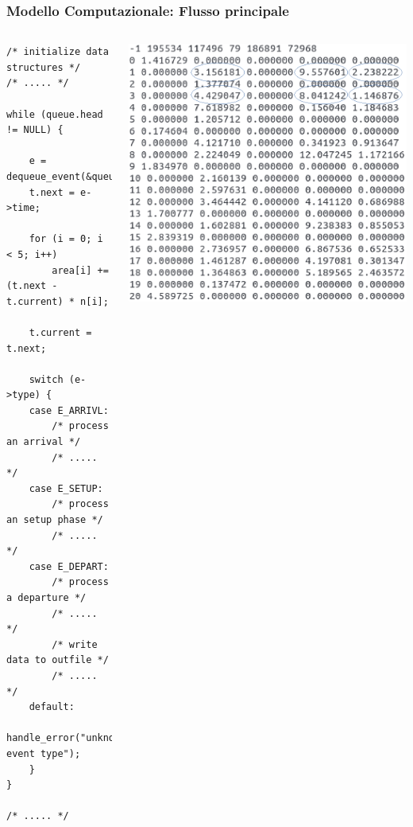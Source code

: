 \begin{frame}[fragile]
\frametitle{Modello Computazionale: Flusso principale}
\begin{columns}
\begin{lstlisting}
/* initialize data structures */
/* ..... */

while (queue.head != NULL) { 

    e = dequeue_event(&queue);
    t.next = e->time;

    for (i = 0; i < 5; i++)
        area[i] += (t.next - t.current) * n[i];

    t.current = t.next;   

    switch (e->type) {
    case E_ARRIVL:              
        /* process an arrival */
        /* ..... */
    case E_SETUP:
        /* process an setup phase */
        /* ..... */
    case E_DEPART: 
        /* process a departure */
        /* ..... */
        /* write data to outfile */
        /* ..... */
    default:
        handle_error("unknown event type");
    }
}

/* ..... */
\end{lstlisting}
\includegraphics[width=\textwidth]{../figures/srvdat}
\end{columns}
\end{frame}

